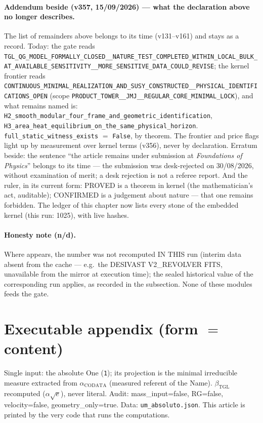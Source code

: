 \documentclass[11pt]{article}
\newcommand{\bTGL}{\beta_{\mathrm{TGL}}}\newcommand{\Msun}{M_{\odot}}\newcommand{\TGL}{\mathrm{TGL}}
\theoremstyle{definition}\newtheorem{deriv}{Derivation}
\begin{document}
\paragraph*{Addendum beside (v357, 15/09/2026) --- what the declaration above no longer describes.} The list of remainders above belongs to its time (v131--v161) and stays as a record. Today: the gate reads \texttt{TGL\_QG\_MODEL\_FORMALLY\_CLOSED\_\_NATURE\_TEST\_COMPLETED\_WITHIN\_LOCAL\_BULK\_AT\_AVAILABLE\_SENSITIVITY\_\_MORE\_SENSITIVE\_DATA\_COULD\_REVISE}; the kernel frontier reads \texttt{CONTINUOUS\_MINIMAL\_REALIZATION\_AND\_SUSY\_CONSTRUCTED\_\_PHYSICAL\_IDENTIFICATIONS\_OPEN} (scope \texttt{PRODUCT\_TOWER\_\_JMJ\_\_REGULAR\_CORE\_MINIMAL\_LOCK}), and what remains named is: \texttt{H2\_smooth\_modular\_four\_frame\_and\_geometric\_identification}, \texttt{H3\_area\_heat\_equilibrium\_on\_the\_same\_physical\_horizon}. \texttt{full\_static\_witness\_exists} $=$ \texttt{False}, by theorem. The frontier and price flags light up by measurement over kernel terms (v356), never by declaration. Erratum beside: the sentence ``the article remains under submission at \emph{Foundations of Physics}'' belongs to its time --- the submission was desk-rejected on 30/08/2026, without examination of merit; a desk rejection is not a referee report. And the ruler, in its current form: PROVED is a theorem in kernel (the mathematician's act, auditable); CONFIRMED is a judgement about nature --- that one remains forbidden. The ledger of this chapter now lists every stone of the embedded kernel (this run: 1025), with live hashes.

\paragraph{Honesty note (n/d).} Where  appears, the number was not recomputed IN THIS run (interim data absent from the cache --- e.g.\ the DESIVAST V2\_REVOLVER FITS, unavailable from the mirror at execution time); the sealed historical value of the corresponding run applies, as recorded in the subsection. None of these modules feeds the gate.

\section*{Executable appendix (form $=$ content)}

Single input: the absolute One (\texttt{1}); its projection is the minimal irreducible measure extracted from $\alpha_{\mathrm{CODATA}}$ (measured referent of the Name). $\bTGL$ recomputed ($\alpha\sqrt{e}$), never literal. Audit: mass\_input=false, RG=false, velocity=false, geometry\_only=true. Data: \texttt{um\_absoluto.json}. This article is printed by the very code that runs the computations.
\end{document}
